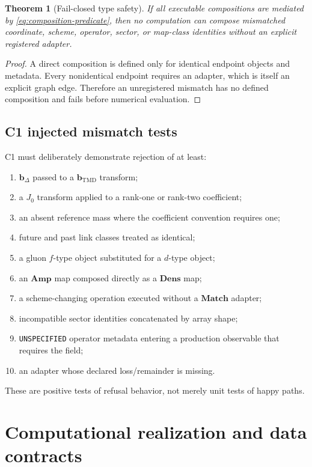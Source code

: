 \documentclass[11pt]{article}
\newtheorem{theorem}[definition]{Theorem}
\newcommand{\bD}{\bm{b}_{\Delta}}
\newcommand{\bM}{\bm{b}_{\mathrm{TMD}}}
\newcommand{\Amp}{\mathbf{Amp}}
\newcommand{\Dens}{\mathbf{Dens}}
\newcommand{\Match}{\mathbf{Match}}
\begin{document}
\begin{theorem}[Fail-closed type safety]
\label{thm:fail-closed}
If all executable compositions are mediated by
\cref{eq:composition-predicate}, then no computation can compose mismatched
coordinate, scheme, operator, sector, or map-class identities without an
explicit registered adapter.
\end{theorem}

\begin{proof}
A direct composition is defined only for identical endpoint objects and
metadata.  Every nonidentical endpoint requires an adapter, which is itself
an explicit graph edge.  Therefore an unregistered mismatch has no defined
composition and fails before numerical evaluation.
\end{proof}

\subsection{C1 injected mismatch tests}

C1 must deliberately demonstrate rejection of at least:
\begin{enumerate}
\item \(\bD\) passed to a \(\bM\) transform;
\item a \(J_0\) transform applied to a rank-one or rank-two coefficient;
\item an absent reference mass where the coefficient convention requires one;
\item future and past link classes treated as identical;
\item a gluon \(f\)-type object substituted for a \(d\)-type object;
\item an \(\Amp\) map composed directly as a \(\Dens\) map;
\item a scheme-changing operation executed without a \(\Match\) adapter;
\item incompatible sector identities concatenated by array shape;
\item \texttt{UNSPECIFIED} operator metadata entering a production
observable that requires the field;
\item an adapter whose declared loss/remainder is missing.
\end{enumerate}
These are positive tests of refusal behavior, not merely unit tests of happy
paths.

\section{Computational realization and data contracts}
\label{sec:software}
\end{document}
